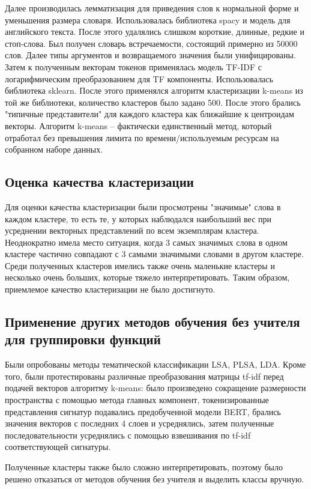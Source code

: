 Далее производилась лемматизация для приведения слов к нормальной форме и уменьшения размера словаря. Использовалась библиотека spacy и модель для английского текста. После этого удалялись слишком короткие, длинные, редкие и стоп-слова. Был получен словарь встречаемости, состоящий примерно из 50000 слов. Далее типы аргументов и возвращаемого значения были унифицированы. Затем к полученным векторам токенов применялась модель TF-IDF с логарифмическим преобразованием для TF компоненты. Использовалась библиотека sklearn. После этого применялся алгоритм кластеризации k-means из той же библиотеки, количество кластеров было задано 500. После этого брались "типичные представители" для каждого кластера как ближайшие к центроидам векторы. Алгоритм k-means -- фактически единственный метод, который отработал без превышения лимита по времени/используемым ресурсам на собранном наборе данных.

\subsection{Оценка качества кластеризации}
Для оценки качества кластеризации были просмотрены "значимые" слова в каждом кластере, то есть те, у которых наблюдался наибольший вес при усреднении векторных представлений по всем экземплярам кластера. Неоднократно имела место ситуация, когда 3 самых значимых слова в одном кластере частично совпадают с 3 самыми значимыми словами в другом кластере. Среди полученных кластеров имелись также очень маленькие кластеры и несколько очень больших, которые тяжело интерпретировать. Таким образом, приемлемое качество кластеризации не было достигнуто.

\subsection{Применение других методов обучения без учителя для группировки функций}
Были опробованы методы тематической классификации LSA, PLSA, LDA. Кроме того, были протестированы различные преобразования матрицы tf-idf перед подачей векторов алгоритму k-means: было произведено сокращение размерности пространства с помощью метода главных компонент, токенизированные представления сигнатур подавались предобученной модели BERT, брались значения векторов с последних 4 слоев и усреднялись, затем полученные последовательности усреднялись с помощью взвешивания по tf-idf соответствующей сигнатуры. 

Полученные кластеры также было сложно интерпретировать, поэтому было решено отказаться от методов обучения без учителя и выделить классы вручную.


